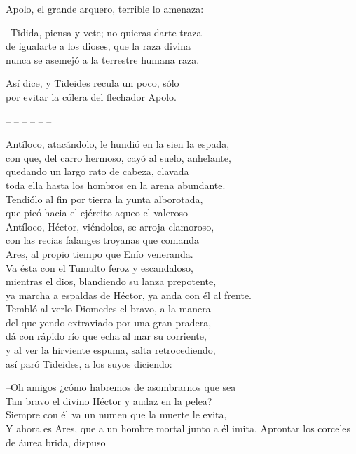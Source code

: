 Apolo, el grande arquero, terrible lo amenaza:\par
--Tidida, piensa y vete; no quieras darte traza\\
de igualarte a los dioses, que la raza divina\\
nunca se asemejó a la terrestre humana raza.\par
Así dice, y Tideides recula un poco, sólo\\
por evitar la cólera del flechador Apolo.\par
\pend
%
\noindent-- -- -- -- -- --\par
%
\pstart
{}Antíloco, atacándolo, le hundió en la sien la espada,\\
con que, del carro hermoso, cayó al suelo, anhelante,\\
quedando un largo rato de cabeza, clavada\\
toda ella hasta los hombros en la arena abundante.\\
Tendiólo al fin por tierra la yunta alborotada,\\
que picó hacia el ejército aqueo el valeroso\\
Antíloco, Héctor, viéndolos, se arroja clamoroso,\\
con las recias falanges troyanas que comanda\\
Ares, al propio tiempo que Enío veneranda.\\
Va ésta con el Tumulto feroz y escandaloso,\\
mientras el dios, blandiendo su lanza prepotente,\\
ya marcha a espaldas de Héctor, ya anda con él al frente.\\
Tembló al verlo Diomedes el bravo, a la manera\\
del que yendo extraviado por una gran pradera,\\
dá con rápido río que echa al mar su corriente,\\
y al ver la hirviente espuma, salta retrocediendo,\\
así paró Tideides, a los suyos diciendo:\par
--Oh amigos ¿cómo habremos de asombrarnos que sea\\
Tan bravo el divino Héctor y audaz en la pelea?\\
Siempre con él va un numen que la muerte le evita,\\
Y ahora es Ares, que a un hombre mortal junto a él imita.
\pend
\separator
%
\pstart
{}
Aprontar los corceles de áurea brida, dispuso\\
